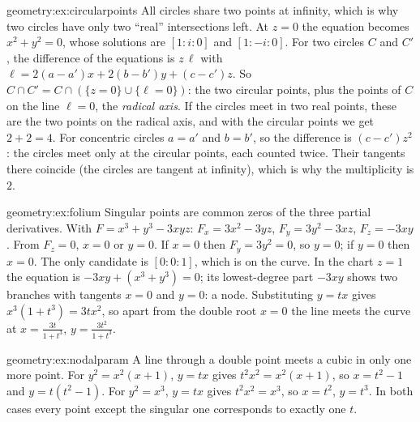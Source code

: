 \begin{solution}{geometry:ex:circularpoints}
\idea All circles share two points at infinity, which is why two circles have only two ``real'' intersections left.
\writeup At $z=0$ the equation becomes $x^2+y^2=0$, whose solutions are $[1:i:0]$ and $[1:-i:0]$. For two circles $C$ and $C'$, the difference of the equations is
$z\,\ell$ with $\ell=2(a-a')x+2(b-b')y+(c-c')z$. So $C\cap C'=C\cap(\{z=0\}\cup\{\ell=0\})$: the two circular points, plus the points of $C$ on the line $\ell=0$, the
\emph{radical axis}. If the circles meet in two real points, these are the two points on the radical axis, and with the circular points we get $2+2=4$. For
concentric circles $a=a'$ and $b=b'$, so the difference is $(c-c')z^2$: the circles meet only at the circular points, each counted twice. Their tangents there
coincide (the circles are tangent at infinity), which is why the multiplicity is $2$.
\end{solution}

\begin{solution}{geometry:ex:folium}
\idea Singular points are common zeros of the three partial derivatives.
\writeup With $F=x^3+y^3-3xyz$: $F_x=3x^2-3yz$, $F_y=3y^2-3xz$, $F_z=-3xy$. From $F_z=0$, $x=0$ or $y=0$. If $x=0$ then $F_y=3y^2=0$, so $y=0$; if $y=0$ then
$x=0$. The only candidate is $[0:0:1]$, which is on the curve. In the chart $z=1$ the equation is $-3xy+(x^3+y^3)=0$; its lowest-degree part $-3xy$ shows two
branches with tangents $x=0$ and $y=0$: a node. Substituting $y=tx$ gives $x^3(1+t^3)=3tx^2$, so apart from the double root $x=0$ the line meets the curve at
$x=\frac{3t}{1+t^3}$, $y=\frac{3t^2}{1+t^3}$.
\end{solution}

\begin{solution}{geometry:ex:nodalparam}
\idea A line through a double point meets a cubic in only one more point.
\writeup For $y^2=x^2(x+1)$, $y=tx$ gives $t^2x^2=x^2(x+1)$, so $x=t^2-1$ and $y=t(t^2-1)$. For $y^2=x^3$, $y=tx$ gives $t^2x^2=x^3$, so $x=t^2$, $y=t^3$. In both cases
every point except the singular one corresponds to exactly one $t$.
\end{solution}

